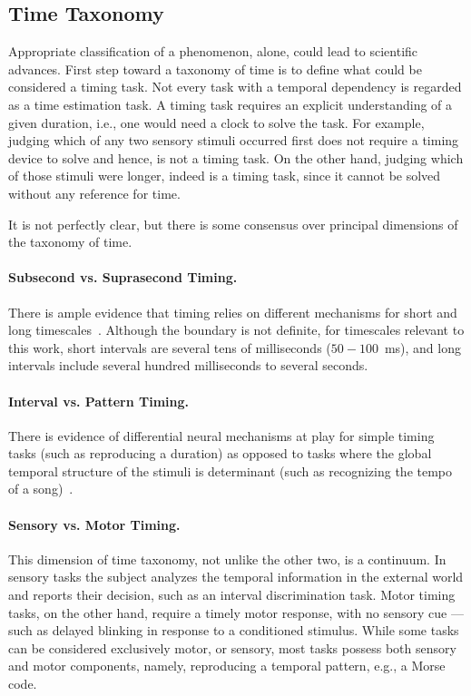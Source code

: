 \subsection[Time Taxonomy]{Time Taxonomy} \label{ch:intro:taxonomy}
Appropriate classification of a phenomenon, alone, could lead to scientific advances.\footnotemark
{}
First step toward a taxonomy of time is to define what could be considered a timing task.
Not every task with a temporal dependency is regarded as a time estimation task.
A timing task requires an explicit understanding of a given duration, i.e., one would need a clock to solve the task.
For example, judging which of any two sensory stimuli occurred first does not require a timing device to solve and hence, is not a timing task.
On the other hand, judging which of those stimuli were longer, indeed is a timing task, since it cannot be solved without any reference for time.
\par
It is not perfectly clear, but there is some consensus over principal dimensions of the taxonomy of time.

\paragraph{Subsecond vs. Suprasecond Timing.} \label{ch:intro:taxonomy:SUBvsSUPRA}
There is ample evidence that timing relies on different mechanisms for short and long timescales~\cite[see][]{Paton2018NeuronRev}.
Although the boundary is not definite, for timescales relevant to this work, short intervals are several tens of milliseconds ($50-100$~ms), and long intervals include several hundred milliseconds to several seconds.

\paragraph{Interval vs. Pattern Timing.} \label{ch:intro:taxonomy:INTvsPAT}
There is evidence of differential neural mechanisms at play for simple timing tasks (such as reproducing a duration) as  opposed to tasks where the global temporal structure of the stimuli is determinant (such as recognizing the tempo of a song)~\cite{teki2011}.

\paragraph{Sensory vs. Motor Timing.} \label{ch:intro:taxonomy:SENvsMOT}
This dimension of time taxonomy, not unlike the other two, is a continuum.
In sensory tasks the subject analyzes the temporal information in the external world and reports their decision, such as an interval discrimination task.
Motor timing tasks, on the other hand, require a timely motor response, with no sensory cue --- such as delayed blinking in response to a conditioned stimulus.
While some tasks can be considered exclusively motor, or sensory, most tasks possess both sensory and motor components, namely, reproducing a temporal pattern, e.g., a Morse code.

